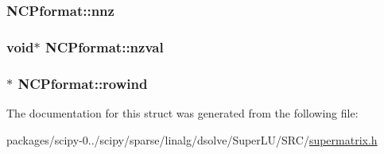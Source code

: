\subsubsection[{nnz}]{ N\+C\+Pformat\+::nnz}\label{structNCPformat_ac8c12ffc9edd0906608612727ad406ed}
\hypertarget{structNCPformat_a519ed66fdf9da30c76c079474503c764}{}
\subsubsection[{nzval}]{\setlength{\rightskip}{0pt plus 5cm}void$\ast$ N\+C\+Pformat\+::nzval}\label{structNCPformat_a519ed66fdf9da30c76c079474503c764}
\hypertarget{structNCPformat_a8a27cd5a756bc313cc3c487a84e8ba30}{}
\subsubsection[{rowind}]{$\ast$ N\+C\+Pformat\+::rowind}\label{structNCPformat_a8a27cd5a756bc313cc3c487a84e8ba30}


The documentation for this struct was generated from the following file\+:\begin{DoxyCompactItemize}
\item 
packages/scipy-\/0../scipy/sparse/linalg/dsolve/\+Super\+L\+U/\+S\+R\+C/\hyperlink{supermatrix_8h}{supermatrix.\+h}\end{DoxyCompactItemize}
